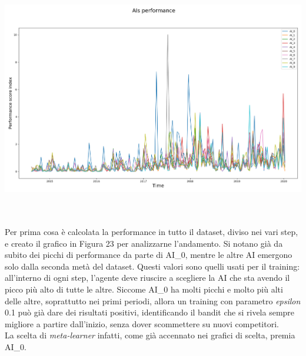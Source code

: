 \documentclass[a4paper,12pt]{report}
\begin{document}
\begin{fig}
\begin{fig}
	\begin{center}
		\includegraphics[width=\linewidth]{performance_ai_250}
	\end{center}
	\label{Figura 19}
\end{fig}
\\~\\Per prima cosa è calcolata la performance in tutto il dataset, diviso nei vari step, e creato il grafico in Figura 23 per analizzarne l'andamento. Si notano già da subito dei picchi di performance da parte di AI\_0, mentre le altre AI emergono solo dalla seconda metà del dataset. Questi valori sono quelli usati per il training: all'interno di ogni step, l'agente deve riuscire a scegliere la AI che sta avendo il picco più alto di tutte le altre. Siccome AI\_0 ha molti picchi e molto più alti delle altre, soprattutto nei primi periodi, allora un training con parametro \textit{epsilon} 0.1 può già dare dei risultati positivi, identificando il bandit che si rivela sempre migliore a partire dall'inizio, senza dover scommettere su nuovi competitori.\\ La scelta di \textit{meta-learner} infatti, come già accennato nei grafici di scelta, premia AI\_0.

\end{fig}
\end{document}
